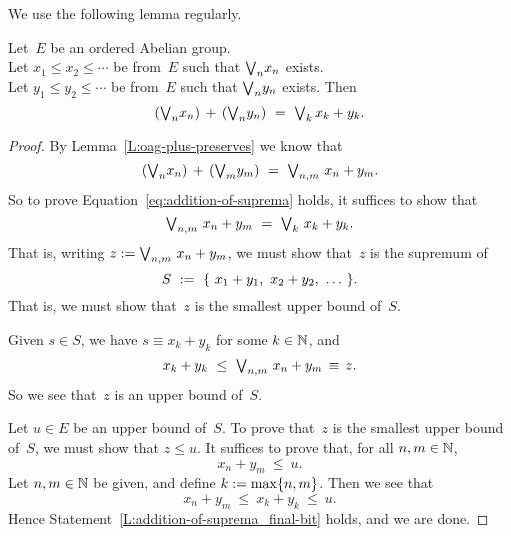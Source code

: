 \documentclass[main.tex]{subfiles}
\begin{document}
\noindent
We use the following
lemma
regularly.
%
%
\begin{lem}
\label{L:addition-of-suprema}
Let~$E$ be an ordered Abelian group.\\
Let $x_1 \leq x_2 \leq \dotsb$
be from~$E$ such that $\textstyle{\bigvee}_n x_n$ exists.\\
Let $y_1 \leq y_2 \leq \dotsb$
be from~$E$ such that $\textstyle{\bigvee}_n y_n$ exists.
Then
\begin{equation}
\label{eq:addition-of-suprema}
(\bv_n x_n) \,+\, (\bv_n y_n)
\ =\ 
\bv_k\, x_k + y_k.
\end{equation}
\end{lem}
\begin{proof}
By Lemma~\ref{L:oag-plus-preserves}
we know that 
\begin{equation*}
(\bv_n x_n) \,+\, (\bv_m y_m) \ =\  \bv_{n,m}\ x_n + y_m.
\end{equation*}
So to prove Equation~\eqref{eq:addition-of-suprema} holds,
it suffices to show that 
\begin{equation*}
\bv_{n,m}\ x_n + y_m \ =\ \bv_k \ x_k + y_k.
\end{equation*}
That is,
writing $z:= \textstyle{\bigvee}_{n,m}\ x_n + y_m$,
we must show that~$z$ is the supremum of 
\begin{equation*}
S \ \eqdf\ \{\ x_1+y_1,\ x_2 + y_2,\  \dotsc \ \}.
\end{equation*}
That is,
we must show that~$z$ is the smallest upper bound of~$S$.

Given $s\in S$, we have $s\equiv x_k + y_k$ for some  $k\in \mathbb{N}$,
and 
\begin{equation*}
x_k + y_k \ \leq\  \textstyle{\bigvee}_{n,m}\ x_n + y_m\,\equiv\, z.
\end{equation*}
So we see that~$z$ is an upper bound of~$S$.

Let $u\in E$ be an upper bound of~$S$.
To prove that~$z$ is the smallest upper bound
of~$S$, we must show that $z\leq u$.
It suffices to prove that,
for all $n,m\in \mathbb{N}$,
\begin{equation}
\label{L:addition-of-suprema_final-bit}
x_n + y_m \ \leq \ u.
\end{equation}
Let $n,m\in\mathbb{N}$ be given,
and define  $k:= \max\{n,m\}$.
Then we see that
\begin{equation*}
x_n + y_m \ \leq\  x_k + y_k \ \leq\  u.
\end{equation*}
Hence Statement~\eqref{L:addition-of-suprema_final-bit}
holds,
and we are done.
\end{proof}
\end{document}
